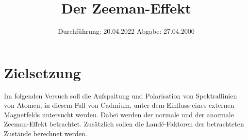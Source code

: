 
\usepackage{tikz}
\usepackage{lipsum}

\subject{V27}
\title{Der Zeeman-Effekt}
\date{
    Durchführung: 20.04.2022
     \hspace{3em}
    Abgabe: 27.04.2000
}


\maketitle
\thispagestyle{empty}
\tableofcontents
\newpage

\section{Zielsetzung}

    Im folgenden Versuch soll die Aufspaltung und Polarisation von Spektrallinien von Atomen,
    in diesem Fall von Cadmium,
    unter dem Einfluss eines externen Magnetfelds untersucht werden.
    Dabei werden der normale und der anormale Zeeman-Effekt betrachtet.
    Zusätzlich sollen die Landé-Faktoren der betrachteten Zustände berechnet werden.


\clearpage


\clearpage


\clearpage


\clearpage

\printbibliography


